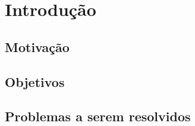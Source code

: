 \section{Introdução}
\subsection{Motivação}
\subsection{Objetivos}
\subsection{Problemas a serem resolvidos}
